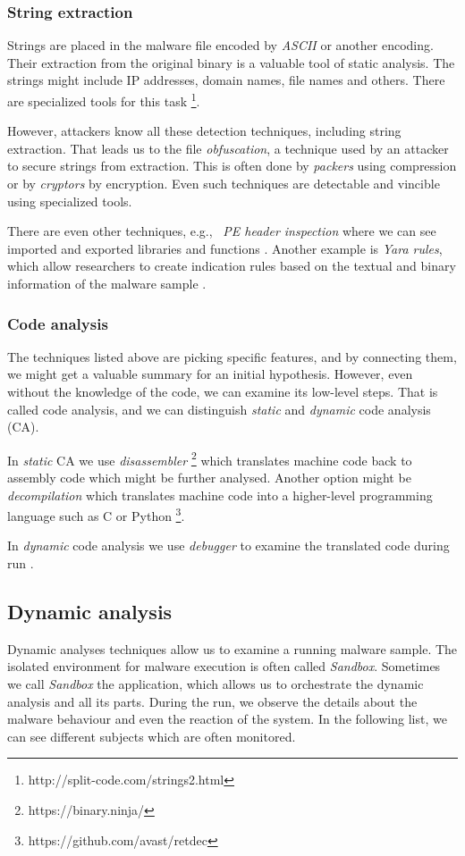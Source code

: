 \subsubsection*{String extraction}
Strings are placed in the malware file encoded by \emph{ASCII} or another encoding. Their extraction from the original binary is a valuable tool of static analysis. The strings might include IP addresses, domain names, file names and others. There are specialized tools for this task \footnote{http://split-code.com/strings2.html}. 

However, attackers know all these detection techniques, including string extraction. That leads us to the file \emph{obfuscation}, a technique used by an attacker to secure strings from extraction. This is often done by \emph{packers} using compression or by \emph{cryptors} by encryption. Even such techniques are detectable and vincible using specialized tools.

There are even other techniques, e.g., \ \emph{PE header inspection} where we can see imported and exported libraries and functions \cite{Sikorski2012}. Another example is \emph{Yara rules}, which allow researchers to create indication rules based on the textual and binary information of the malware sample \cite{KA2018}.

\subsubsection*{Code analysis}
The techniques listed above are picking specific features, and by connecting them, we might get a valuable summary for an initial hypothesis. 
However, even without the knowledge of the code, we can examine its low-level steps. That is called code analysis, and we can distinguish \emph{static} and \emph{dynamic} code analysis (CA).

In \emph{static} CA we use \emph{disassembler} \footnote{https://binary.ninja/} which translates machine code back to assembly code which might be further analysed. Another option might be \emph{decompilation} which translates machine code into a higher-level programming language such as C or Python \footnote{https://github.com/avast/retdec}.

In \emph{dynamic} code analysis we use \emph{debugger} to examine the translated code during run \cite{KA2018}.

\subsection{Dynamic analysis}
Dynamic analyses techniques allow us to examine a running malware sample. The isolated environment for malware execution is often called \emph{Sandbox}. Sometimes we call \emph{Sandbox} the application, which allows us to orchestrate the dynamic analysis and all its parts. During the run, we observe the details about the malware behaviour and even the reaction of the system. In the following list, we can see different subjects which are often monitored.

